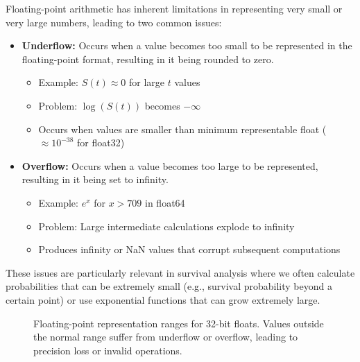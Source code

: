 Floating-point arithmetic has inherent limitations in representing very small or very large numbers, leading to two common issues:

\begin{definitionbox}[title=Underflow and Overflow]
\begin{itemize}
    \item \textbf{Underflow:} Occurs when a value becomes too small to be represented in the floating-point format, resulting in it being rounded to zero.
    \begin{itemize}
        \item Example: $S(t) \approx 0$ for large $t$ values
        \item Problem: $\log(S(t))$ becomes $-\infty$
        \item Occurs when values are smaller than minimum representable float ($\approx 10^{-38}$ for float32)
    \end{itemize}

    \item \textbf{Overflow:} Occurs when a value becomes too large to be represented, resulting in it being set to infinity.
    \begin{itemize}
        \item Example: $e^x$ for $x > 709$ in float64
        \item Problem: Large intermediate calculations explode to infinity
        \item Produces infinity or NaN values that corrupt subsequent computations
    \end{itemize}
\end{itemize}
\end{definitionbox}

These issues are particularly relevant in survival analysis where we often calculate probabilities that can be extremely small (e.g., survival probability beyond a certain point) or use exponential functions that can grow extremely large.

\begin{figure}[htbp]
    \centering
    \caption{Floating-point representation ranges for 32-bit floats. Values outside the normal range suffer from underflow or overflow, leading to precision loss or invalid operations.}
    \label{fig:float-ranges}
\end{figure}


